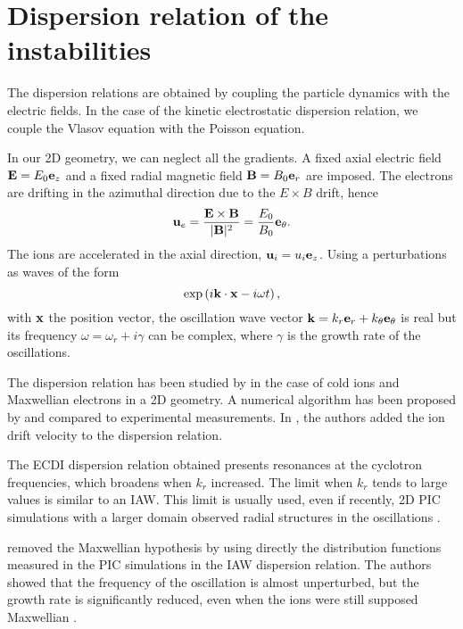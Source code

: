 
\section{Dispersion relation of the instabilities}
  \label{sec-DR-kinetic}
  
  
  The dispersion relations are obtained by coupling the particle dynamics with the electric fields.
  In the case of the kinetic electrostatic dispersion relation, we couple the Vlasov equation with the Poisson equation.
  
  In our \ac{2D} geometry, we can neglect all the gradients.
  A fixed axial electric field ${\mathbf E} = E_0 {\mathbf e_z}$ and a fixed radial magnetic field ${\mathbf B} = B_0 {\mathbf e_r}$ are imposed.
  The electrons are drifting in the azimuthal direction due to the $E\times B$ drift, hence
  \[ {\mathbf u_{e}} = \frac{{\mathbf E} \times {\mathbf B}}{\lvert{\mathbf B}\rvert^2} = \frac{E_0}{B_0}  {\mathbf e_{\theta}}.    \]
  The ions are accelerated in the axial direction, $ {\mathbf u_i} = u_i  {\mathbf e_z}$.
  Using a perturbations as waves of the form \[ \exp \left( i {\mathbf k} \cdot {\mathbf x} - i \omega t  \right), \]
  with ${\mathbf x}$ the position vector, the oscillation wave vector ${\mathbf k} = k_r {\mathbf e_r} + k_{\theta} {\mathbf e_{\theta}}$ is real but its frequency $\omega = \omega_r + i \gamma$ can be complex, where $\gamma$ is the growth rate of the oscillations. 
  
  \vspace{1em}
  The dispersion relation has been studied by \citet{ducrocq2006} in the case of cold ions and Maxwellian electrons in a \ac{2D} geometry.
  A numerical algorithm has been proposed by \citet{cavalier2013} and compared to experimental measurements.
  In \citet{lafleur2016}, the authors added the ion drift velocity to the dispersion relation.
  
  The \ac{ECDI} dispersion relation obtained presents resonances at the cyclotron frequencies, which broadens when $k_r$ increased.
  The limit when $k_r$ tends to large values is similar to an \ac{IAW}.
  This limit is usually used, even if recently, \ac{2D} \ac{PIC} simulations with a larger domain observed radial structures in the oscillations \citep{janhunen2018,hara2019a}.
  
  \citet{lafleur2018} removed the Maxwellian hypothesis by using directly the distribution functions measured in the \ac{PIC} simulations in the \ac{IAW} dispersion relation.
  The authors showed that the frequency of the oscillation is almost unperturbed, but the growth rate is significantly reduced, even when the ions were still supposed Maxwellian \citep[Fig. 8]{lafleur2018}.
  

